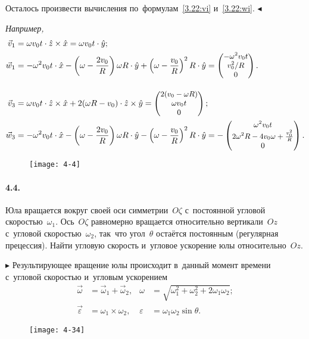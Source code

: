 \documentclass{weekly}
\begin{document}
Осталось произвести вычисления по~формулам~\eqref{3.22:vi}
и~\eqref{3.22:wi}. \hfill $\blacktriangleleft$

\textsl{Например,}
\begin{align}
    \vec v_1 &= \omega v_0 t \cdot \hat z \times \hat x
        = \omega v_0 t \cdot \hat y; \\
    \vec w_1 &= -\omega^2 v_0 t \cdot \hat x -
            \left(\omega - \frac{2v_0}{R}\right)\omega R \cdot \hat y+
            \left(\omega - \frac{v_0}{R}\right)^2 R \cdot \hat y
        = \small\begin{pmatrix}-\omega^2 v_0 t\\v_0^2/R\\0\end{pmatrix}.
\\[2ex]
    \vec v_3 &= \omega v_0 t \cdot \hat z \times \hat x +
            2(\omega R - v_0) \cdot \hat z \times \hat y
        = \small\begin{pmatrix}2(v_0 - \omega R)\\\omega v_0 t\\0\end{pmatrix}; \\
    \vec w_3 &= -\omega^2 v_0 t \cdot \hat x -
            \left(\omega - \frac{2v_0}{R}\right)\omega R \cdot \hat y-
            \left(\omega - \frac{v_0}{R}\right)^2 R \cdot \hat y
        = -\small\begin{pmatrix}\omega^2 v_0 t\\2\omega^2 R - 4v_0 \omega +
            \frac{v_0^2}{R}\\0\end{pmatrix}.
\end{align}


\bigskip
\begin{wrapfigure}[6]{r}{3.3cm}\vspace{-6mm}
    \texttt{[image: 4-4]}
\end{wrapfigure}
\paragraph{4.4.} Юла вращается вокруг своей оси симметрии~$O\zeta$
с~постоянной угловой скоростью~$\omega_1$. Ось~$O\zeta$
равномерно вращается относительно вертикали~$Oz$ с~угловой
скоростью~$\omega_2$, так~что угол~$\theta$ остаётся постоянным
(регулярная прецессия). Найти угловую скорость и~угловое ускорение
юлы относительно~$Oz$.

$\blacktriangleright$ Результирующее вращение юлы происходит
в~данный момент времени с~угловой скоростью и~угловым ускорением
\begin{align*}
    \vec\omega &= \vec\omega_1 + \vec\omega_2, &
    \omega &= \sqrt{\omega_1^2 + \omega_2^2 + 2\omega_1\omega_2};
\\\tag*{$\blacktriangleleft$}
    \vec\varepsilon &= \omega_1 \times \omega_2, &
    \varepsilon &= \omega_1 \omega_2 \sin\theta.
\end{align*}


\clearpage
\begin{wrapfigure}[7]{r}{5.5cm}\vspace{3mm}
    \texttt{[image: 4-34]}
\end{wrapfigure}
\end{document}
